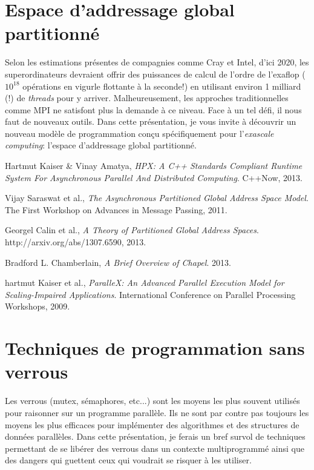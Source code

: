 \documentclass{article}
\begin{document}
\newpage

\section*{Espace d'addressage global partitionné}
Selon les estimations présentes de compagnies comme Cray et Intel, d'ici 2020, les superordinateurs devraient offrir des puissances de calcul de l'ordre de l'exaflop ($10^{18}$ opérations en vigurle flottante à la seconde!) en utilisant environ 1 milliard (!) de \textit{threads} pour y arriver. Malheureusement, les approches traditionnelles comme MPI ne satisfont plus la demande à ce niveau. Face à un tel défi, il nous faut de nouveaux outils. Dans cette présentation, je vous invite à découvrir un nouveau modèle de programmation conçu spécifiquement pour l'\textit{exascale computing}: l'espace d'addressage global partitionné. 

\renewcommand\refname{Références PGAS}
\begin{thebibliography}{9}
          Hartmut Kaiser \& Vinay Amatya,
          \emph{HPX: A C++ Standards Compliant Runtime System For Asynchronous Parallel And Distributed Computing}.
          C++Now, 2013.
          
          Vijay Saraswat et al.,
          \emph{The Asynchronous Partitioned Global Address Space Model}.
          The First Workshop on Advances in Message Passing, 2011.
          
          Georgel Calin et al.,
          \emph{A Theory of Partitioned Global Address Spaces}.
          http://arxiv.org/abs/1307.6590, 2013.
          
          Bradford L. Chamberlain,
          \emph{A Brief Overview of Chapel}.
          2013.
          
          hartmut Kaiser et al.,
          \emph{ParalleX: An Advanced Parallel Execution Model for Scaling-Impaired Applications}.
          International Conference on Parallel Processing Workshops, 2009.
\end{thebibliography}

\newpage

\section*{Techniques de programmation sans verrous}
Les verrous (mutex, sémaphores, etc...) sont les moyens les plus souvent utilisés pour raisonner sur un programme parallèle. Ils ne sont par contre pas toujours les moyens les plus efficaces pour implémenter des algorithmes et des structures de données parallèles. Dans cette présentation, je ferais un bref survol de techniques permettant de se libérer des verrous dans un contexte multiprogrammé ainsi que des dangers qui guettent ceux qui voudrait se risquer à les utiliser.
\end{document}
